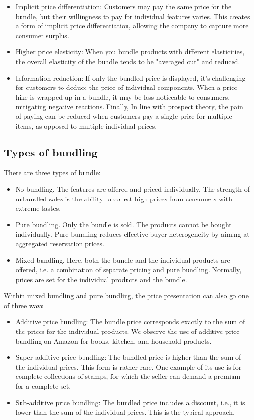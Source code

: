 \documentclass{article}
\begin{document}
\begin{itemize}
\item Implicit price differentiation:  Customers may pay the same price for the bundle, but their willingness to pay for individual features varies. This creates a form of implicit price differentiation, allowing the company to capture more consumer surplus.
\item Higher price elasticity: When you bundle products with different elasticities, the overall elasticity of the bundle tends to be "averaged out" and reduced.
\item Information reduction: If only the bundled price is displayed, it's challenging for customers to deduce the price of individual components. When a price hike is wrapped up in a bundle, it may be less noticeable to consumers, mitigating negative reactions. Finally, In line with prospect theory, the pain of paying can be reduced when customers pay a single price for multiple items, as opposed to multiple individual prices.
\end{itemize}

 
\subsection{Types of bundling}

There are three types of bundle:
\begin{itemize}
\item No bundling. The features are offered and priced individually. The strength of unbundled sales is the ability to collect high prices from consumers with extreme tastes.
\item Pure bundling. Only the bundle is sold. The products cannot be bought individually. Pure bundling reduces effective buyer heterogeneity by aiming at aggregated reservation prices.
\item Mixed bundling. Here, both the bundle and the individual products are offered, i.e. a combination of separate pricing and pure bundling. Normally, prices are set for the individual products and the bundle.
\end{itemize}


Within mixed bundling and pure bundling, the price presentation can also go one of three ways

\begin{itemize}
\item Additive price bundling: The bundle price corresponds exactly to the sum of the prices for the individual products. We observe the use of additive price bundling on Amazon for books, kitchen, and household products.
\item Super-additive price bundling: The bundled price is higher than the sum of the individual prices. This form is rather rare. One example of its use is for complete collections of stamps, for which the seller can demand a premium for a complete set.
\item Sub-additive price bundling: The bundled price includes a discount, i.e., it is lower than the sum of the individual prices. This is the typical approach.
\end{itemize}
\end{document}
